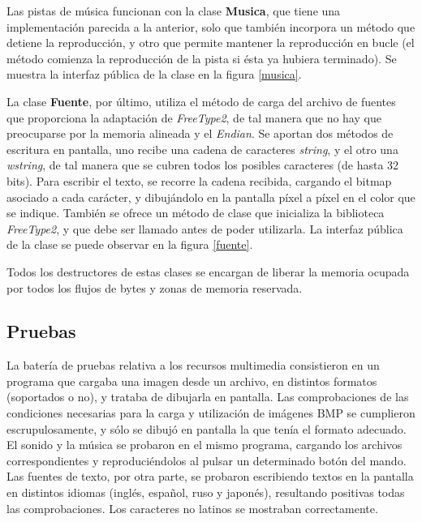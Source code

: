 
Las pistas de música funcionan con la clase \textbf{Musica}, que tiene una implementación parecida a la anterior, solo que también incorpora un método que detiene la reproducción, y otro que permite mantener la reproducción en bucle (el método comienza la reproducción de la pista si ésta ya hubiera terminado). Se muestra la interfaz pública de la clase en la figura \ref{musica}.\\


La clase \textbf{Fuente}, por último, utiliza el método de carga del archivo de fuentes que proporciona la adaptación de \emph{FreeType2}, de tal manera que no hay que preocuparse por la memoria alineada y el \emph{Endian}. Se aportan dos métodos de escritura en pantalla, uno recibe una cadena de caracteres \emph{string}, y el otro una \emph{wstring}, de tal manera que se cubren todos los posibles caracteres (de hasta 32 bits). Para escribir el texto, se recorre la cadena recibida, cargando el bitmap asociado a cada carácter, y dibujándolo en la pantalla píxel a píxel en el color que se indique. También se ofrece un método de clase que inicializa la biblioteca \emph{FreeType2}, y que debe ser llamado antes de poder utilizarla. La interfaz pública de la clase se puede observar en la figura \ref{fuente}.\\


Todos los destructores de estas clases se encargan de liberar la memoria ocupada por todos los flujos de bytes y zonas de memoria reservada.

\subsection{Pruebas}

La batería de pruebas relativa a los recursos multimedia consistieron en un programa que cargaba una imagen desde un archivo, en distintos formatos (soportados o no), y trataba de dibujarla en pantalla. Las comprobaciones de las condiciones necesarias para la carga y utilización de imágenes BMP se cumplieron escrupulosamente, y sólo se dibujó en pantalla la que tenía el formato adecuado.\\

El sonido y la música se probaron en el mismo programa, cargando los archivos correspondientes y reproduciéndolos al pulsar un determinado botón del mando. Las fuentes de texto, por otra parte, se probaron escribiendo textos en la pantalla en distintos idiomas (inglés, español, ruso y japonés), resultando positivas todas las comprobaciones. Los caracteres no latinos se mostraban correctamente.

